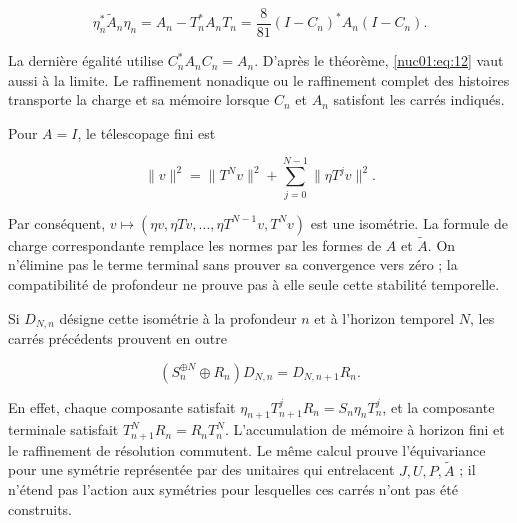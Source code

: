 \begin{equation}
\eta_n^*\widetilde A_n\eta_n
=A_n-T_n^*A_nT_n
=\frac8{81}(I-C_n)^*A_n(I-C_n).
\label{nuc01:eq:12}
\end{equation}

La dernière égalité utilise \(C_n^*A_nC_n=A_n\). D’après le théorème, \eqref{nuc01:eq:12} vaut aussi à la limite. Le raffinement nonadique ou le raffinement complet des histoires transporte la charge et sa mémoire lorsque \(C_n\) et \(A_n\) satisfont les carrés indiqués.


Pour \(A=I\), le télescopage fini est

\[
\|v\|^2=\|T^Nv\|^2+\sum_{j=0}^{N-1}\|\eta T^jv\|^2.
\]

Par conséquent, \(v\mapsto(\eta v,\eta Tv,\ldots,\eta T^{N-1}v,T^Nv)\) est une isométrie. La formule de charge correspondante remplace les normes par les formes de \(A\) et \(\widetilde A\). On n’élimine pas le terme terminal sans prouver sa convergence vers zéro ; la compatibilité de profondeur ne prouve pas à elle seule cette stabilité temporelle.

Si \(D_{N,n}\) désigne cette isométrie à la profondeur \(n\) et à l’horizon temporel \(N\), les carrés précédents prouvent en outre


\[
(S_n^{\oplus N}\oplus R_n)D_{N,n}
=D_{N,n+1}R_n.
\]

En effet, chaque composante satisfait \(\eta_{n+1}T_{n+1}^jR_n=S_n\eta_nT_n^j\), et la composante terminale satisfait \(T_{n+1}^NR_n=R_nT_n^N\). L’accumulation de mémoire à horizon fini et le raffinement de résolution commutent. Le même calcul prouve l’équivariance pour une symétrie représentée par des unitaires qui entrelacent \(J,U,P,\widetilde A\) ; il n’étend pas l’action aux symétries pour lesquelles ces carrés n’ont pas été construits.
